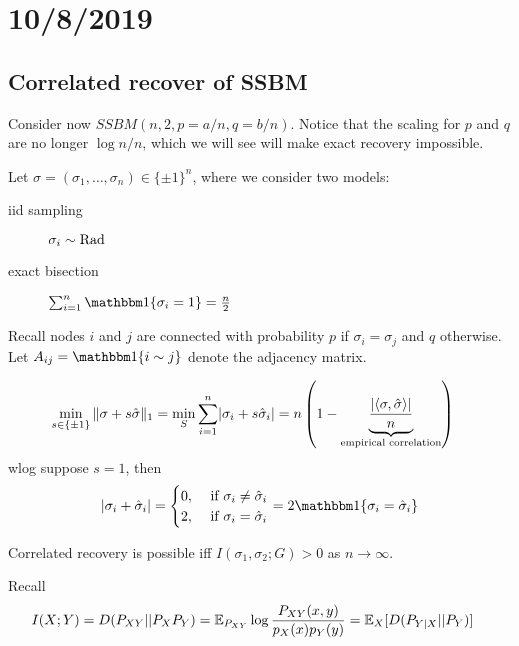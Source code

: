 \section{10/8/2019}

\subsection{Correlated recover of SSBM}

Consider now $SSBM(n,2,p=a/n, q=b/n)$. Notice that
the scaling for $p$ and $q$ are no longer $\log n / n$,
which we will see will make exact recovery impossible.

Let $\sigma = (\sigma_1, \ldots, \sigma_n) \in \{\pm 1\}^n$, where
we consider two models:
\begin{description}
  \item[iid sampling] $\sigma_i \sim \text{Rad}$
  \item[exact bisection] $\sum_{i=1}^n \ind\{\sigma_i = 1\} = \frac{n}{2}$
\end{description}
Recall nodes $i$ and $j$ are connected with probability $p$ if $\sigma_i =
\sigma_j$ and $q$ otherwise. Let $A_{ij} = \ind\{i \sim j\}$ denote
the adjacency matrix.

\begin{definition}
  \begin{align}
    \min_{s \in \{\pm 1\}} \|\sigma + s \hat\sigma\|_1
    &= \min_S \sum_{i=1}^n \lvert \sigma_i + s \hat{\sigma}_i \rvert
    = n \left( 1 - \underbrace{\frac{\lvert \braket{\sigma, \hat\sigma} \rvert}{n}}_{\text{empirical correlation}}\right)
  \end{align}
  wlog suppose $s = 1$, then
  \begin{align}
    \lvert \sigma_i + \hat\sigma_i\rvert
    = \begin{cases}
      0, &\text{ if }\sigma_i \neq \hat\sigma_i \\
      2, &\text{ if }\sigma_i = \hat\sigma_i
    \end{cases}
    = 2 \ind\{\sigma_i = \hat\sigma_i\}
  \end{align}
\end{definition}

\begin{theorem}
  Correlated recovery is possible iff $I(\sigma_1, \sigma_2; G) > 0$
  as $n \to \infty$.
\end{theorem}

Recall
\begin{align}
  I(X; Y)
  &= D(P_{XY} || P_X P_Y)
  = \mathbb{E}_{P_{XY}} \log \frac{P_{XY}(x,y)}{p_X(x) p_Y(y)}
  = \mathbb{E}_X[D(P_{Y \mid X} || P_Y)]
\end{align}

